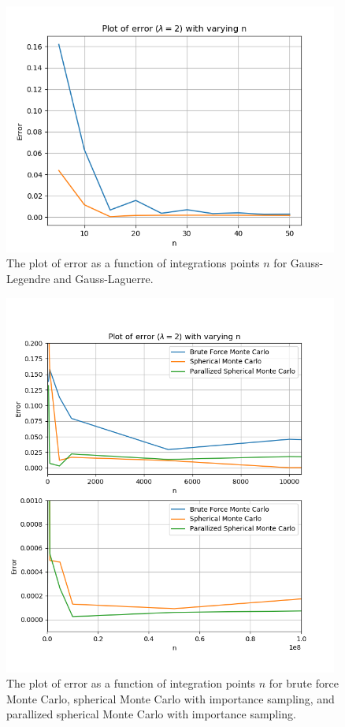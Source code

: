 \documentclass{article}
\begin{document}
  \begin{figure}[ht]
    \centering
    \includegraphics[width = 11cm]{images/error-integrationpoints.png}
    \caption{The plot of error as a function of integrations points $n$ for Gauss-Legendre and Gauss-Laguerre. }
    \label{fig:integrationpointspng}
  \end{figure}

    \begin{figure}[ht]
    \centering
    \includegraphics[width = 11cm]{images/error-montecarlo.png}
    \caption{The plot of error as a function of integration points $n$ for brute force Monte Carlo, spherical Monte Carlo with importance sampling, and parallized spherical Monte Carlo with importance sampling. }
    \label{fig:montecarlopng}
  \end{figure}
\end{document}
